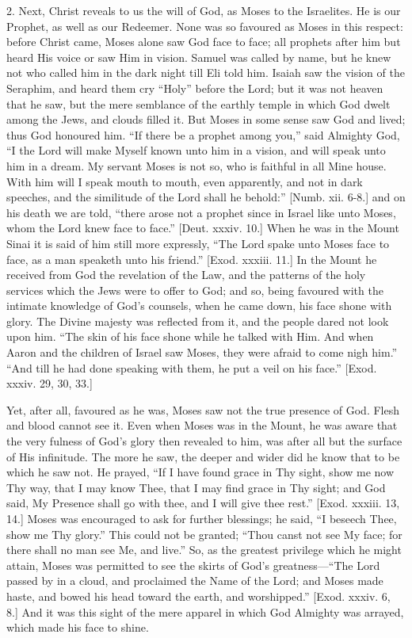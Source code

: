 2. Next, Christ reveals to us the will of God, as Moses to the
Israelites. He is our Prophet, as well as our Redeemer. None was so
favoured as Moses in this respect: before Christ came, Moses alone saw
God face to face; all prophets after him but heard His voice or saw
Him in vision. Samuel was called by name, but he knew not who called
him in the dark night till Eli told him. Isaiah saw the vision of the
Seraphim, and heard them cry ``Holy'' before the Lord; but it
was not heaven that he saw, but the mere semblance of the earthly
temple in which God dwelt among the Jews, and clouds filled it. But
Moses in some sense saw God and lived; thus God honoured him. ``If
there be a prophet among you,'' said Almighty God, ``I the
Lord will make Myself known unto him in a vision, and will speak unto
him in a dream. My servant Moses is not so, who is faithful in all
Mine house. With him will I speak mouth to mouth, even apparently, and
not in dark speeches, and the similitude of the Lord shall he
behold:'' [Numb. xii. 6-8.] and on his death we are told,
``there arose not a prophet since in Israel like unto Moses, whom
the Lord knew face to face.'' [Deut. xxxiv. 10.] When he was in
the Mount Sinai it is said of him still more expressly, ``The Lord
spake unto Moses face to face, as a man speaketh unto his
friend.'' [Exod. xxxiii. 11.] In the Mount he received from God
the revelation of the Law, and the patterns of the holy services which
the Jews were to offer to God; and so, being favoured with the
intimate knowledge of God's counsels, when he came down, his face
shone with glory. The Divine majesty was reflected from it, and the
people dared not look upon him. ``The skin of his face shone while
he talked with Him. And when Aaron and the children of Israel saw
Moses, they were afraid to come nigh him.'' ``And till he had
done speaking with them, he put a veil on his face.'' [Exod. xxxiv.
29, 30, 33.]

Yet, after all, favoured as he was, Moses saw not the true presence
of God. Flesh and blood cannot see it. Even when Moses was in the
Mount, he was aware that the very fulness of God's glory then revealed
to him, was after all but the surface of His infinitude. The more he
saw, the deeper and wider did he know that to be which he saw not. He
prayed, ``If I have found grace in Thy sight, show me now Thy way,
that I may know Thee, that I may find grace in Thy sight; and God
said, My Presence shall go with thee, and I will give thee rest.''
[Exod. xxxiii. 13, 14.] Moses was encouraged to ask for further
blessings; he said, ``I beseech Thee, show me Thy glory.''
This could not be granted; ``Thou canst not see My face; for there
shall no man see Me, and live.'' So, as the greatest privilege
which he might attain, Moses was permitted to see the skirts of God's
greatness—``The Lord passed by in a cloud, and proclaimed the
Name of the Lord; and Moses made haste, and bowed his head toward the
earth, and worshipped.'' [Exod. xxxiv. 6, 8.] And it was this
sight of the mere apparel in which God Almighty was arrayed, which
made his face to shine.

